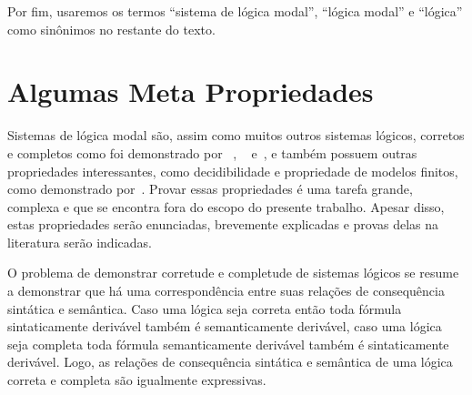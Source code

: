         Por fim, usaremos os termos ``sistema de lógica modal'', ``lógica modal'' e ``lógica'' como sinônimos no restante do texto.

    \section{Algumas Meta Propriedades}
        \label{sec:LM-MetaPropriedades}
        Sistemas de lógica modal são, assim como muitos outros sistemas lógicos, corretos e completos como foi demonstrado por
        ~, ~ e~, e também possuem outras propriedades interessantes,
        como decidibilidade e propriedade de modelos finitos, como demonstrado por~.
        Provar essas propriedades é uma tarefa grande, complexa e que se encontra fora do escopo do presente trabalho.
        Apesar disso, estas propriedades serão enunciadas, brevemente explicadas e provas delas na literatura serão indicadas.

        O problema de demonstrar corretude e completude de sistemas lógicos se resume a demonstrar que há uma correspondência entre suas relações
        de consequência sintática e semântica. Caso uma lógica seja correta então toda fórmula sintaticamente derivável também é semanticamente
        derivável, caso uma lógica seja completa toda fórmula semanticamente derivável também é sintaticamente derivável. Logo, as relações de
        consequência sintática e semântica de uma lógica correta e completa são igualmente expressivas.


